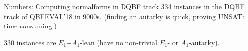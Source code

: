 \documentclass[xcolor=table	]{beamer}
\begin{document}
\begin{frame}{Numbers: Computing normalforms in DQBF track}
334 instances in the DQBF track of QBFEVAL'18 in 9000s. \newline
(finding an autarky is quick, proving UNSAT: time consuming.)\newline

330 instances are $E_1$+$A_1$-lean (have no non-trivial $E_1$- or $A_1$-autarky). 

\begin{table}[t]
  \centering
{}
\end{table}
\end{frame}
\end{document}
